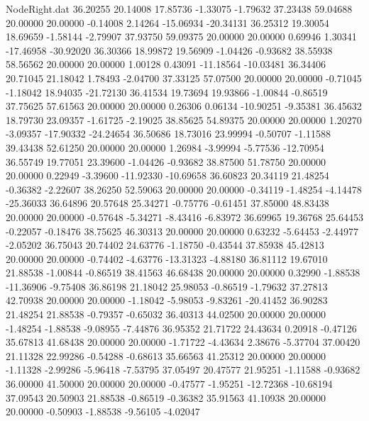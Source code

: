 \begin{filecontents}{NodeRight.dat}
  36.20255   20.14008   17.85736    -1.33075   -1.79632   37.23438   59.04688   20.00000   20.00000   -0.14008    2.14264  -15.06934  -20.34131
  36.25312   19.30054   18.69659    -1.58144   -2.79907   37.93750   59.09375   20.00000   20.00000    0.69946    1.30341  -17.46958  -30.92020
  36.30366   18.99872   19.56909    -1.04426   -0.93682   38.55938   58.56562   20.00000   20.00000    1.00128    0.43091  -11.18564  -10.03481
  36.34406   20.71045   21.18042     1.78493   -2.04700   37.33125   57.07500   20.00000   20.00000   -0.71045   -1.18042   18.94035  -21.72130
  36.41534   19.73694   19.93866    -1.00844   -0.86519   37.75625   57.61563   20.00000   20.00000    0.26306    0.06134  -10.90251   -9.35381
  36.45632   18.79730   23.09357    -1.61725   -2.19025   38.85625   54.89375   20.00000   20.00000    1.20270   -3.09357  -17.90332  -24.24654
  36.50686   18.73016   23.99994    -0.50707   -1.11588   39.43438   52.61250   20.00000   20.00000    1.26984   -3.99994   -5.77536  -12.70954
  36.55749   19.77051   23.39600    -1.04426   -0.93682   38.87500   51.78750   20.00000   20.00000    0.22949   -3.39600  -11.92330  -10.69658
  36.60823   20.34119   21.48254    -0.36382   -2.22607   38.26250   52.59063   20.00000   20.00000   -0.34119   -1.48254   -4.14478  -25.36033
  36.64896   20.57648   25.34271    -0.75776   -0.61451   37.85000   48.83438   20.00000   20.00000   -0.57648   -5.34271   -8.43416   -6.83972
  36.69965   19.36768   25.64453    -0.22057   -0.18476   38.75625   46.30313   20.00000   20.00000    0.63232   -5.64453   -2.44977   -2.05202
  36.75043   20.74402   24.63776    -1.18750   -0.43544   37.85938   45.42813   20.00000   20.00000   -0.74402   -4.63776  -13.31323   -4.88180
  36.81112   19.67010   21.88538    -1.00844   -0.86519   38.41563   46.68438   20.00000   20.00000    0.32990   -1.88538  -11.36906   -9.75408
  36.86198   21.18042   25.98053    -0.86519   -1.79632   37.27813   42.70938   20.00000   20.00000   -1.18042   -5.98053   -9.83261  -20.41452
  36.90283   21.48254   21.88538    -0.79357   -0.65032   36.40313   44.02500   20.00000   20.00000   -1.48254   -1.88538   -9.08955   -7.44876
  36.95352   21.71722   24.43634     0.20918   -0.47126   35.67813   41.68438   20.00000   20.00000   -1.71722   -4.43634    2.38676   -5.37704
  37.00420   21.11328   22.99286    -0.54288   -0.68613   35.66563   41.25312   20.00000   20.00000   -1.11328   -2.99286   -5.96418   -7.53795
  37.05497   20.47577   21.95251    -1.11588   -0.93682   36.00000   41.50000   20.00000   20.00000   -0.47577   -1.95251  -12.72368  -10.68194
  37.09543   20.50903   21.88538    -0.86519   -0.36382   35.91563   41.10938   20.00000   20.00000   -0.50903   -1.88538   -9.56105   -4.02047

\end{filecontents}
